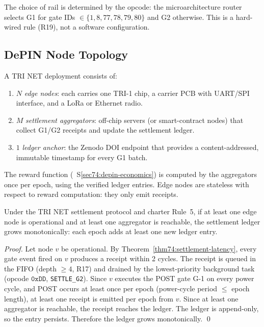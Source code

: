 The choice of rail is determined by the opcode: the microarchitecture router
selects G1 for gate IDs $\in \{1, 8, 77, 78, 79, 80\}$ and G2 otherwise.
This is a hard-wired rule (R19), not a software configuration.

\subsection{DePIN Node Topology}
\label{sec74:node-topology}

A TRI NET deployment consists of:

\begin{enumerate}
  \item $N$ \emph{edge nodes}: each carries one TRI-1 chip, a carrier PCB
    with UART/SPI interface, and a LoRa or Ethernet radio.
  \item $M$ \emph{settlement aggregators}: off-chip servers (or smart-contract
    nodes) that collect G1/G2 receipts and update the settlement ledger.
  \item $1$ \emph{ledger anchor}: the Zenodo DOI endpoint that provides
    a content-addressed, immutable timestamp for every G1 batch.
\end{enumerate}

The reward function (\ S\ref{sec74:depin-economics}) is computed by the
aggregators once per epoch, using the verified ledger entries.  Edge nodes
are stateless with respect to reward computation: they only emit receipts.

\begin{theorem}
\label{thm74:depin-liveness}
Under the TRI NET settlement protocol and charter Rule~5, if at least one
edge node is operational and at least one aggregator is reachable, the
settlement ledger grows monotonically: each epoch adds at least one new
ledger entry.
\end{theorem}
\begin{proof}
Let node $v$ be operational.  By Theorem~\ref{thm74:settlement-latency},
every gate event fired on $v$ produces a receipt within 2 cycles.  The
receipt is queued in the FIFO (depth $\geq 4$, R17) and drained by the
lowest-priority background task (opcode $\mathtt{0xDD}$, \texttt{SETTLE\_G2}).
Since $v$ executes the POST gate G-1 on every power cycle, and POST occurs
at least once per epoch (power-cycle period $\leq$ epoch length), at least
one receipt is emitted per epoch from $v$.  Since at least one aggregator
is reachable, the receipt reaches the ledger.  The ledger is append-only,
so the entry persists.  Therefore the ledger grows monotonically.
\qed
\end{proof}

